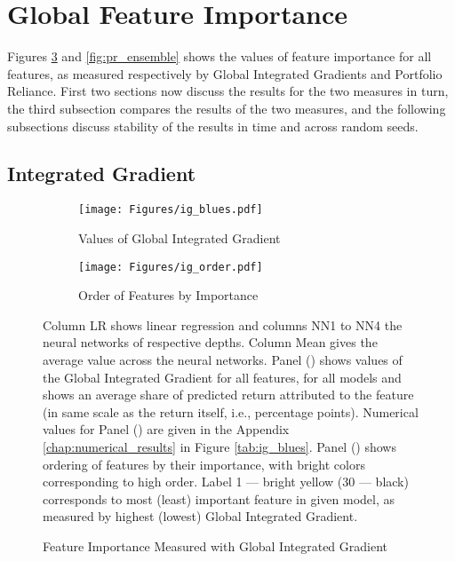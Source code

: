 	
\section{Global Feature Importance}
	\label{chap:global_feature_importance}
	
	Figures \ref{fig:ig_ensemble} and \ref{fig:pr_ensemble} shows the values of feature importance for all features, as measured respectively by Global Integrated Gradients and Portfolio Reliance. First two sections now discuss the results for the two measures in turn, the third subsection compares the results of the two measures, and the following subsections discuss stability of the results in time and across random seeds. 
	
	\subsection{Integrated Gradient}
	
		\begin{figure}	
			\centering		
			\begin{subfigure}[t]{\textwidth}
				\texttt{[image: Figures/ig\_blues.pdf]}
				\caption{Values of Global Integrated Gradient}
				\label{fig:ig_blues}
			\end{subfigure}
			
			\begin{subfigure}[t]{\textwidth}
				\texttt{[image: Figures/ig\_order.pdf]}
				\caption{Order of Features by Importance}
				\label{fig:ig_order}
			\end{subfigure}
			\caption{Feature Importance Measured with Global Integrated Gradient}
			\medskip
			\small
			Column LR shows linear regression and columns NN1 to NN4 the neural networks of respective depths. Column Mean gives the average value across the neural networks. Panel () shows values of the Global Integrated Gradient for all features, for all models and shows an average share of predicted return attributed to the feature (in same scale as the return itself, i.e., percentage points).  Numerical values for Panel () are given in the Appendix \ref{chap:numerical_results} in Figure \ref{tab:ig_blues}. Panel () shows ordering of features by their importance, with bright colors corresponding to high order. Label 1 --- bright yellow (30 --- black) corresponds to most (least) important feature in given model, as measured by highest (lowest) Global Integrated Gradient. 
			\label{fig:ig_ensemble}
		\end{figure}
	
